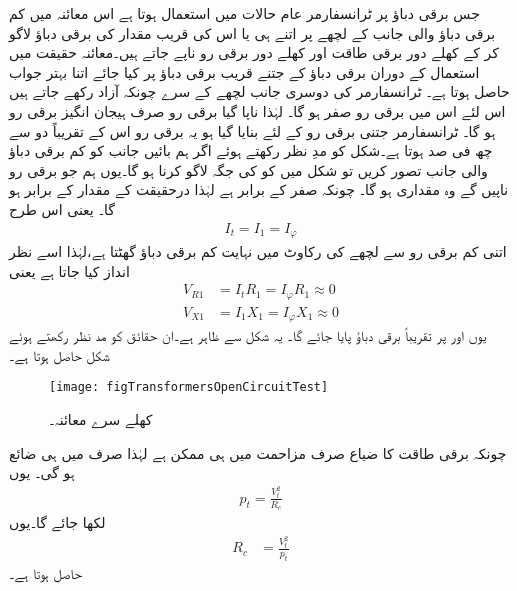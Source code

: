  جس برقی دباؤ پر ٹرانسفارمر عام حالات میں استعمال ہوتا ہے اس معائنہ میں کم برقی دباؤ والی جانب کے لچھے پر اتنے ہی یا اس کی قریب مقدار کی برقی دباؤ  لاگو کر کے کھلے دور برقی طاقت  اور  کھلے دور برقی رو   ناپے جاتے ہیں۔معائنہ حقیقت میں استعمال کے دوران برقی دباؤ کے جتنے قریب برقی دباؤ پر کیا جائے اتنا بہتر جواب حاصل ہوتا ہے۔ ٹرانسفارمر کی دوسری جانب لچھے کے سرے چونکہ آزاد رکھے جاتے ہیں اس لئے اس میں  برقی رو صفر ہو گا۔  لہٰذا ناپا گیا برقی رو صرف ہیجان انگیز برقی رو  ہو گا۔ ٹرانسفارمر جتنی برقی رو کے لئے بنایا گیا ہو یہ برقی رو اس  کے تقریباً دو سے چھ  فی صد ہوتا ہے۔شکل    کو مدِ نظر رکھتے ہوئے اگر ہم بائیں جانب کو کم برقی دباؤ والی جانب تصور کریں تو شکل میں  کو   کی جگہ لاگو کرنا ہو گا۔یوں ہم جو برقی رو ناپیں گے وہ  مقداری   ہو گا۔ چونکہ   صفر کے برابر ہے لہٰذا   درحقیقت  کے مقدار  کے برابر ہو گا۔ یعنی  اس  طرح
\begin{align*}
I_t=I_1=I_\varphi
\end{align*}
اتنی کم برقی رو سے لچھے کی رکاوٹ میں نہایت کم برقی دباؤ گھٹتا ہے،لہٰذا اسے نظر انداز کیا جاتا ہے یعنی
\begin{align*}
V_{R1}&=I_t R_1=I_\varphi R_1 \approx 0\\
V_{X1}&=I_1 X_1=I_\varphi X_1 \approx 0
\end{align*}
یوں    اور  پر  تقریباً  برقی دباؤ پایا جائے گا۔ یہ شکل   سے ظاہر ہے۔ان حقائق کو مد نظر رکھتے ہوئے شکل  حاصل ہوتا ہے۔
\begin{figure}
\centering
\texttt{[image: figTransformersOpenCircuitTest]}
\caption{کھلے سرے معائنہ۔}
\label{شکل_ٹرانسفارمر_کھلے_سرے_معائنہ}
\end{figure}

چونکہ برقی طاقت کا ضیاع صرف مزاحمت میں ہی ممکن ہے لہٰذا  صرف    میں ہی ضائع ہو گی۔ یوں
\begin{align*}
p_t=\frac{V_t^2}{R_c}
\end{align*}
لکھا جائے گا۔یوں
\begin{align}\label{مساوات_ٹرانسفارمر_کھلے_دور_مزاحمت_حاصل}
R_c&=\frac{V_t^2}{p_t}
\end{align}
حاصل ہوتا ہے۔

